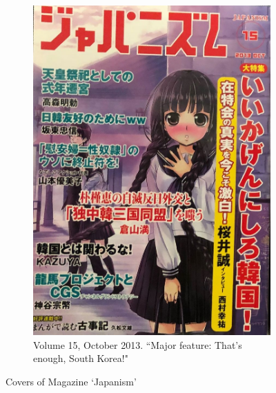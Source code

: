 \documentclass[10pt,british,A4paper,oneside]{memoir}
\begin{document}
\begin{figure}[!htb]
 \begin{subfigure}[b]{0.30\textwidth}
 \includegraphics[width=\textwidth]{images/japanism4.jpg}
 \caption{Volume 15, October 2013. ``Major feature: That’s enough, South Korea!"}
 \label{fig:japanism4}
 \end{subfigure}
 \caption{Covers of Magazine `Japanism'}\label{fig:twitter}
\end{figure}
\end{document}
